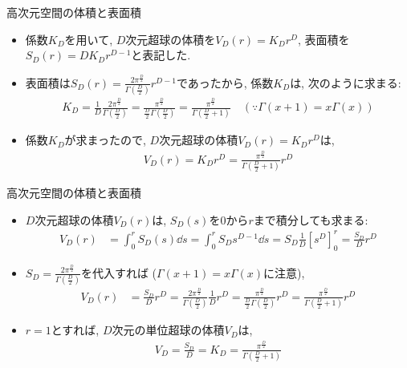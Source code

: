 \documentclass[dvipdfmx,notheorems,t]{beamer}
\begin{document}
\begin{frame}{高次元空間の体積と表面積}
\begin{itemize}
  \item 係数$K_D$を用いて, $D$次元超球の体積を$V_D(r) = K_D r^D$, 表面積を$S_D(r) = D K_D r^{D - 1}$と表記した.
  \item 表面積は$S_D(r) = \frac{2 \pi^\frac{D}{2}}{\Gamma \left( \frac{D}{2} \right)} r^{D - 1}$であったから,
  係数$K_D$は, 次のように求まる:
  \begin{align*}
    K_D = \frac{1}{D} \frac{2 \pi^\frac{D}{2}}{\Gamma \left( \frac{D}{2} \right)}
      = \frac{\pi^\frac{D}{2}}{\frac{D}{2} \Gamma \left( \frac{D}{2} \right)}
      = \frac{\pi^\frac{D}{2}}{\Gamma \left( \frac{D}{2} + 1 \right)} \quad
      (\because \Gamma(x + 1) = x \Gamma(x))
  \end{align*}

  \item 係数$K_D$が求まったので, $D$次元超球の体積$V_D(r) = K_D r^D$は,
  \begin{align*}
    V_D(r) = K_D r^D = \frac{\pi^\frac{D}{2}}{\Gamma \left( \frac{D}{2} + 1 \right)} r^D
  \end{align*}
\end{itemize}
\end{frame}

\begin{frame}{高次元空間の体積と表面積}
\begin{itemize}
  \item $D$次元超球の体積$V_D(r)$は, $S_D(s)$を$0$から$r$まで積分しても求まる:
  \begin{align*}
    V_D(r) &= \int_0^r S_D(s) \dd{s}
    = \int_0^r S_D s^{D - 1} \dd{s}
    = S_D \frac{1}{D} \left[ s^D \right]_0^r
    = \frac{S_D}{D} r^D
  \end{align*}

  \item $S_D = \frac{2 \pi^\frac{D}{2}}{\Gamma \left( \frac{D}{2} \right)}$を代入すれば
  ($\Gamma(x + 1) = x \Gamma(x)$に注意),
  \begin{align*}
    V_D(r) &= \frac{S_D}{D} r^D
      = \frac{2 \pi^\frac{D}{2}}{\Gamma \left( \frac{D}{2} \right)} \frac{1}{D} r^D
      = \frac{\pi^\frac{D}{2}}{\frac{D}{2} \Gamma \left( \frac{D}{2} \right)} r^D
      = \frac{\pi^\frac{D}{2}}{\Gamma \left( \frac{D}{2} + 1 \right)} r^D
  \end{align*}

  \item $r = 1$とすれば, $D$次元の単位超球の体積$V_D$は,
  \begin{align*}
    V_D = \frac{S_D}{D} = K_D = \frac{\pi^\frac{D}{2}}{\Gamma \left( \frac{D}{2} + 1 \right)}
  \end{align*}
\end{itemize}
\end{frame}
\end{document}
